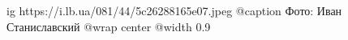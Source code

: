  
 
 
 
 

\ifcmt
  ig https://i.lb.ua/081/44/5c26288165e07.jpeg
	@caption Фото: Иван Станиславский
  @wrap center
  @width 0.9
\fi
